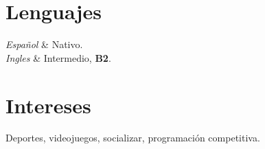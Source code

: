 \documentclass[
    changecolor={111, 156, 45}, 
]{cv-roald}
\begin{document}
\section*{Lenguajes}
\begin{tabularcv}
\textit{Español}     &	Nativo. \\
\textit{Ingles}      &  	Intermedio, \textbf{B2}.\\
\end{tabularcv}

\section*{Intereses}
Deportes, videojuegos, socializar, programación competitiva.
    
\end{document}
